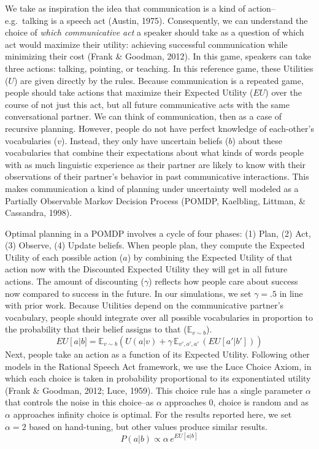 \documentclass[10pt, letterpaper]{article}
\begin{document}
We take as inspiration the idea that communication is a kind of
action--e.g.~talking is a speech act (Austin, 1975). Consequently, we
can understand the choice of \emph{which communicative act} a speaker
should take as a question of which act would maximize their utility:
achieving successful communication while minimizing their cost (Frank \&
Goodman, 2012). In this game, speakers can take three actions: talking,
pointing, or teaching. In this reference game, these Utilities (\(U\))
are given directly by the rules. Because communication is a repeated
game, people should take actions that maximize their Expected Utility
(\(EU\)) over the course of not just this act, but all future
communicative acts with the same conversational partner. We can think of
communication, then as a case of recursive planning. However, people do
not have perfect knowledge of each-other's vocabularies (\(v\)).
Instead, they only have uncertain beliefs (\(b\)) about these
vocabularies that combine their expectations about what kinds of words
people with as much linguistic experience as their partner are likely to
know with their observations of their partner's behavior in past
communicative interactions. This makes communication a kind of planning
under uncertainty well modeled as a Partially Observable Markov Decision
Process (POMDP, Kaelbling, Littman, \& Cassandra, 1998).

Optimal planning in a POMDP involves a cycle of four phases: (1) Plan,
(2) Act, (3) Observe, (4) Update beliefs. When people plan, they compute
the Expected Utility of each possible action (\(a\)) by combining the
Expected Utility of that action now with the Discounted Expected Utility
they will get in all future actions. The amount of discounting
(\(\gamma\)) reflects how people care about success now compared to
success in the future. In our simulations, we set \(\gamma=.5\) in line
with prior work. Because Utilities depend on the communicative partner's
vocabulary, people should integrate over all possible vocabularies in
proportion to the probability that their belief assigns to that
(\(\mathbb{E}_{v \sim b}\)). \[
EU\left[a\right | b] = \mathbb{E}_{v \sim b} \left(U(a|v) + \gamma \,\mathbb{E}_{v',o',a'} \,\left( EU\left[a' | b'\right]\right)\right)
\] Next, people take an action as a function of its Expected Utility.
Following other models in the Rational Speech Act framework, we use the
Luce Choice Axiom, in which each choice is taken in probability
proportional to its exponentiated utility (Frank \& Goodman, 2012; Luce,
1959). This choice rule has a single parameter \(\alpha\) that controls
the noise in this choice--as \(\alpha\) approaches 0, choice is random
and as \(\alpha\) approaches infinity choice is optimal. For the results
reported here, we set \(\alpha = 2\) based on hand-tuning, but other
values produce similar results. \[ 
P\left(a|b\right) \propto \alpha \, e^{EU[a|b]}
\]
\end{document}
